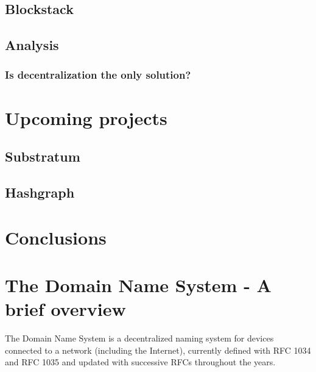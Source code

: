 \documentclass[mscthesis]{usiinfthesis}
\begin{document}
\section{Blockstack}\label{proj:blockstack}

\section{Analysis}

\subsection{Is decentralization the only solution?}

\chapter{Upcoming projects}

\section{Substratum}

\section{Hashgraph}


\chapter{Conclusions}


\appendix 

\chapter{The Domain Name System - A brief overview}\label{appx:dns}
The Domain Name System is a decentralized naming system for devices connected to a network (including the Internet), currently defined with RFC 1034\cite{rfc:1034} and RFC 1035\cite{rfc:1035} and updated with successive RFCs throughout the years.
\end{document}
